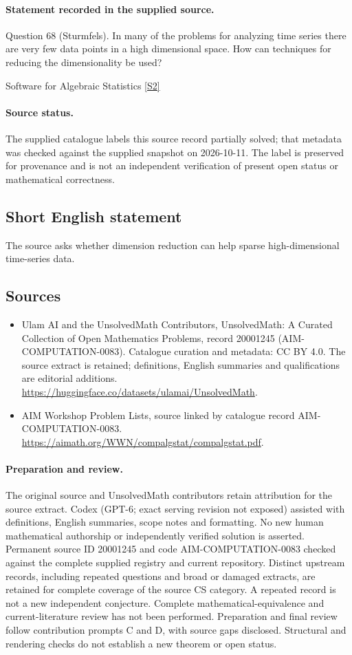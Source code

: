 \documentclass[11pt]{article}
\begin{document}
\paragraph{Statement recorded in the supplied source.}
Question 68 (Sturmfels). In many of the problems for analyzing time series there are very few data points in a high dimensional space. How can techniques for reducing the dimensionality be used?

Software for Algebraic Statistics \href{https://aimath.org/WWN/compalgstat/compalgstat.pdf}{[S2]}
\paragraph{Source status.}
The supplied catalogue labels this source record partially solved; that metadata was checked against the supplied snapshot on 2026-10-11. The label is preserved for provenance and is not an independent verification of present open status or mathematical correctness.
\subsection{Short English statement}
The source asks whether dimension reduction can help sparse high-dimensional time-series data.
\subsection{Sources}
\begin{itemize}
\item[S1] Ulam AI and the UnsolvedMath Contributors, UnsolvedMath: A Curated Collection of Open Mathematics Problems, record 20001245 (AIM-COMPUTATION-0083). Catalogue curation and metadata: CC BY 4.0. The source extract is retained; definitions, English summaries and qualifications are editorial additions.
\url{https://huggingface.co/datasets/ulamai/UnsolvedMath}.
\item[S2] AIM Workshop Problem Lists, source linked by catalogue record AIM-COMPUTATION-0083.
\url{https://aimath.org/WWN/compalgstat/compalgstat.pdf}.
\end{itemize}
\paragraph{Preparation and review.}
The original source and UnsolvedMath contributors retain attribution for the source extract. Codex (GPT-6; exact serving revision not exposed) assisted with definitions, English summaries, scope notes and formatting. No new human mathematical authorship or independently verified solution is asserted. Permanent source ID 20001245 and code AIM-COMPUTATION-0083 checked against the complete supplied registry and current repository. Distinct upstream records, including repeated questions and broad or damaged extracts, are retained for complete coverage of the source CS category. A repeated record is not a new independent conjecture. Complete mathematical-equivalence and current-literature review has not been performed. Preparation and final review follow contribution prompts C and D, with source gaps disclosed. Structural and rendering checks do not establish a new theorem or open status.
\label{end:20001245}
\end{document}
